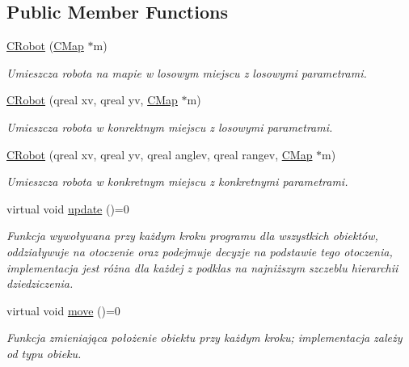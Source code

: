 \subsection*{Public Member Functions}
\begin{DoxyCompactItemize}
\item 
\mbox{\hyperlink{class_c_robot_a9769daad02498cf1d6c7f91b9ed27ff5}{C\+Robot}} (\mbox{\hyperlink{class_c_map}{C\+Map}} $\ast$m)
\begin{DoxyCompactList}\small\item\em Umieszcza robota na mapie w losowym miejscu z losowymi parametrami. \end{DoxyCompactList}\item 
\mbox{\hyperlink{class_c_robot_a9efdb5f31b4380e2aff141e6c55f8515}{C\+Robot}} (qreal xv, qreal yv, \mbox{\hyperlink{class_c_map}{C\+Map}} $\ast$m)
\begin{DoxyCompactList}\small\item\em Umieszcza robota w konrektnym miejscu z losowymi parametrami. \end{DoxyCompactList}\item 
\mbox{\hyperlink{class_c_robot_a39050adcb2119ac8b3bd7042704b487a}{C\+Robot}} (qreal xv, qreal yv, qreal anglev, qreal rangev, \mbox{\hyperlink{class_c_map}{C\+Map}} $\ast$m)
\begin{DoxyCompactList}\small\item\em Umieszcza robota w konkretnym miejscu z konkretnymi parametrami. \end{DoxyCompactList}\item 
virtual void \mbox{\hyperlink{class_c_robot_a8ad8d55a840ced20f85a2a045e9e24ef}{update}} ()=0
\begin{DoxyCompactList}\small\item\em Funkcja wywoływana przy każdym kroku programu dla wszystkich obiektów, oddziaływuje na otoczenie oraz podejmuje decyzje na podstawie tego otoczenia, implementacja jest różna dla każdej z podklas na najniższym szczeblu hierarchii dziedziczenia. \end{DoxyCompactList}\item 
virtual void \mbox{\hyperlink{class_c_robot_a1de9be879213eadf7ded27caedb84598}{move}} ()=0
\begin{DoxyCompactList}\small\item\em Funkcja zmieniająca położenie obiektu przy każdym kroku; implementacja zależy od typu obieku. \end{DoxyCompactList}\item 

\end{DoxyCompactItemize}
